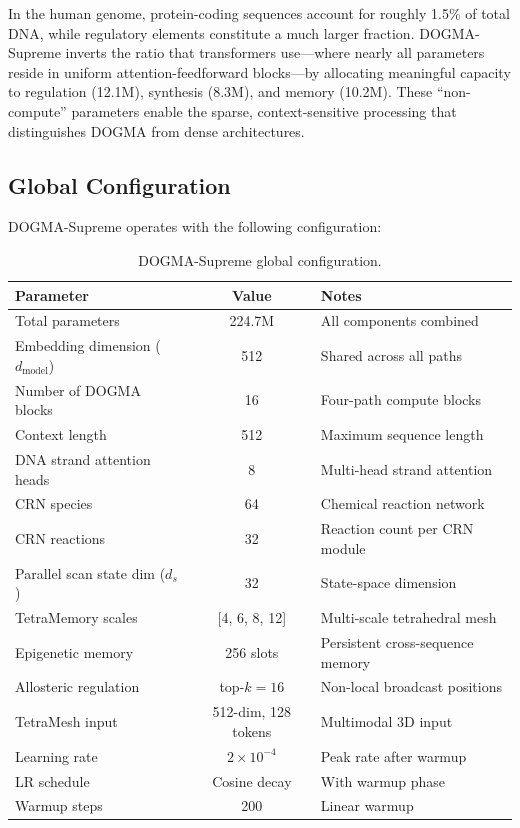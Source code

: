 \begin{keyinsight}
In the human genome, protein-coding sequences account for roughly 1.5\% of total DNA, while regulatory elements constitute a much larger fraction. DOGMA-Supreme inverts the ratio that transformers use---where nearly all parameters reside in uniform attention-feedforward blocks---by allocating meaningful capacity to regulation (12.1M), synthesis (8.3M), and memory (10.2M). These ``non-compute'' parameters enable the sparse, context-sensitive processing that distinguishes DOGMA from dense architectures.
\end{keyinsight}

\subsection{Global Configuration}
\label{sec:global-config}

DOGMA-Supreme operates with the following configuration:

\begin{table}[H]
\centering
\caption{DOGMA-Supreme global configuration.}
\label{tab:supreme-config}
\begin{tabularx}{\textwidth}{L{5.5cm} c Y}
\toprule
\textbf{Parameter} & \textbf{Value} & \textbf{Notes} \\
\midrule
Total parameters & 224.7M & All components combined \\
Embedding dimension ($d_{\text{model}}$) & 512 & Shared across all paths \\
Number of DOGMA blocks & 16 & Four-path compute blocks \\
Context length & 512 & Maximum sequence length \\
DNA strand attention heads & 8 & Multi-head strand attention \\
CRN species & 64 & Chemical reaction network \\
CRN reactions & 32 & Reaction count per CRN module \\
Parallel scan state dim ($d_s$) & 32 & State-space dimension \\
TetraMemory scales & [4, 6, 8, 12] & Multi-scale tetrahedral mesh \\
Epigenetic memory & 256 slots & Persistent cross-sequence memory \\
Allosteric regulation & top-$k = 16$ & Non-local broadcast positions \\
TetraMesh input & 512-dim, 128 tokens & Multimodal 3D input \\
\midrule
Learning rate & $2 \times 10^{-4}$ & Peak rate after warmup \\
LR schedule & Cosine decay & With warmup phase \\
Warmup steps & 200 & Linear warmup \\
\bottomrule
\end{tabularx}
\end{table}


